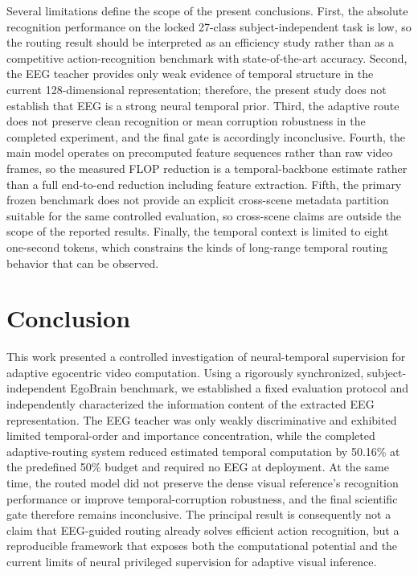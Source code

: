 \documentclass[runningheads]{llncs}
\begin{document}
Several limitations define the scope of the present conclusions. First, the absolute recognition performance on the locked 27-class subject-independent task is low, so the routing result should be interpreted as an efficiency study rather than as a competitive action-recognition benchmark with state-of-the-art accuracy. Second, the EEG teacher provides only weak evidence of temporal structure in the current 128-dimensional representation; therefore, the present study does not establish that EEG is a strong neural temporal prior. Third, the adaptive route does not preserve clean recognition or mean corruption robustness in the completed experiment, and the final gate is accordingly inconclusive. Fourth, the main model operates on precomputed feature sequences rather than raw video frames, so the measured FLOP reduction is a temporal-backbone estimate rather than a full end-to-end reduction including feature extraction. Fifth, the primary frozen benchmark does not provide an explicit cross-scene metadata partition suitable for the same controlled evaluation, so cross-scene claims are outside the scope of the reported results. Finally, the temporal context is limited to eight one-second tokens, which constrains the kinds of long-range temporal routing behavior that can be observed.

\section{Conclusion}

This work presented a controlled investigation of neural-temporal supervision for adaptive egocentric video computation. Using a rigorously synchronized, subject-independent EgoBrain benchmark, we established a fixed evaluation protocol and independently characterized the information content of the extracted EEG representation. The EEG teacher was only weakly discriminative and exhibited limited temporal-order and importance concentration, while the completed adaptive-routing system reduced estimated temporal computation by 50.16\% at the predefined 50\% budget and required no EEG at deployment. At the same time, the routed model did not preserve the dense visual reference's recognition performance or improve temporal-corruption robustness, and the final scientific gate therefore remains inconclusive. The principal result is consequently not a claim that EEG-guided routing already solves efficient action recognition, but a reproducible framework that exposes both the computational potential and the current limits of neural privileged supervision for adaptive visual inference.
\end{document}
